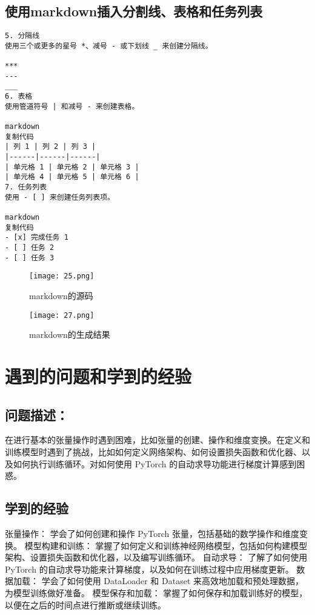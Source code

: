 \documentclass[a4paper, 12pt]{article}
\begin{document}
\subsection{使用markdown插入分割线、表格和任务列表}
\begin{verbatim}
5. 分隔线
使用三个或更多的星号 *、减号 - 或下划线 _ 来创建分隔线。

***
---
___
6. 表格
使用管道符号 | 和减号 - 来创建表格。

markdown
复制代码
| 列 1 | 列 2 | 列 3 |
|------|------|------|
| 单元格 1 | 单元格 2 | 单元格 3 |
| 单元格 4 | 单元格 5 | 单元格 6 |
7. 任务列表
使用 - [ ] 来创建任务列表项。

markdown
复制代码
- [x] 完成任务 1
- [ ] 任务 2
- [ ] 任务 3
\end{verbatim}


\begin{figure}[H]
  \centering
    \texttt{[image: 25.png]}
  \caption{markdown的源码}
   \end{figure}
    \begin{figure}[H]
  \centering
\texttt{[image: 27.png]}
  \caption{markdown的生成结果}
   \end{figure} 

 \section{遇到的问题和学到的经验}

\subsection{问题描述：}
在进行基本的张量操作时遇到困难，比如张量的创建、操作和维度变换。在定义和训练模型时遇到了挑战，比如如何定义网络架构、如何设置损失函数和优化器、以及如何执行训练循环。对如何使用 PyTorch 的自动求导功能进行梯度计算感到困惑。
  \subsection{学到的经验}
张量操作：
学会了如何创建和操作 PyTorch 张量，包括基础的数学操作和维度变换。
模型构建和训练：
掌握了如何定义和训练神经网络模型，包括如何构建模型架构、设置损失函数和优化器，以及编写训练循环。
自动求导：
了解了如何使用 PyTorch 的自动求导功能来计算梯度，以及如何在训练过程中应用梯度更新。
数据加载：
学会了如何使用 DataLoader 和 Dataset 来高效地加载和预处理数据，为模型训练做好准备。
模型保存和加载：
掌握了如何保存和加载训练好的模型，以便在之后的时间点进行推断或继续训练。
\end{document}
